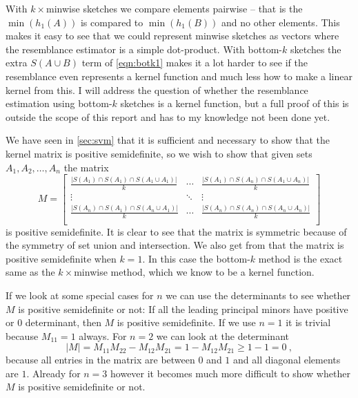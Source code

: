With $k\times$minwise sketches we compare elements pairwise -- that is the
$\min(h_1(A))$ is compared to $\min(h_1(B))$ and no other elements. This makes
it easy to see that we could represent minwise sketches as vectors where
the resemblance estimator is a simple dot-product. With bottom-$k$ sketches
the extra $S(A\cup B)$ term of \autoref{eqn:botk1} makes it a lot harder to
see if the resemblance even represents a kernel function and much less how to
make a linear kernel from this. I will address the question of whether the
resemblance estimation using bottom-$k$ sketches is a kernel function, but a
full proof of this is outside the scope of this report and has to my
knowledge not been done yet.

We have seen in \autoref{sec:svm} that it is sufficient and necessary to
show that the kernel matrix is positive semidefinite, so we wish to show
that given sets $A_1, A_2, \ldots, A_n$ the matrix
\begin{equation}
    M =
    \begin{bmatrix}
        \frac{|S(A_1) \cap S(A_1) \cap S(A_1\cup A_1)|}{k} & \cdots &
        \frac{|S(A_1)\cap S(A_n)\cap S(A_1\cup A_n)|}{k} \\
        \vdots & \ddots & \vdots \\
        \frac{|S(A_n) \cap S(A_1) \cap S(A_n\cup A_1)|}{k} & \cdots &
        \frac{|S(A_n)\cap S(A_n)\cap S(A_n\cup A_n)|}{k} \\
    \end{bmatrix}
\end{equation}
is positive semidefinite. It is clear to see that the matrix is
symmetric because of the symmetry of set union and intersection. We also
get from \cite{Li11} that the matrix is positive semidefinite when $k=1$.
In this case the bottom-$k$ method is the exact same as the $k\times$minwise
method, which we know to be a kernel function.

If we look at some special cases for $n$ we can use the determinants to see
whether $M$ is positive semidefinite or not: If all the leading principal
minors have positive or $0$ determinant, then $M$ is positive semidefinite. If
we use $n=1$ it is trivial because $M_{11} = 1$ always. For $n=2$ we can look
at the determinant
\begin{equation}
    |M| = M_{11}M_{22} - M_{12}M_{21} = 1 - M_{12}M_{21} \ge 1 - 1 = 0\ ,
\end{equation}
because all entries in the matrix are between $0$ and $1$ and all
diagonal elements are $1$. Already for $n=3$ however it becomes much more
difficult to show whether $M$ is positive semidefinite or not.

